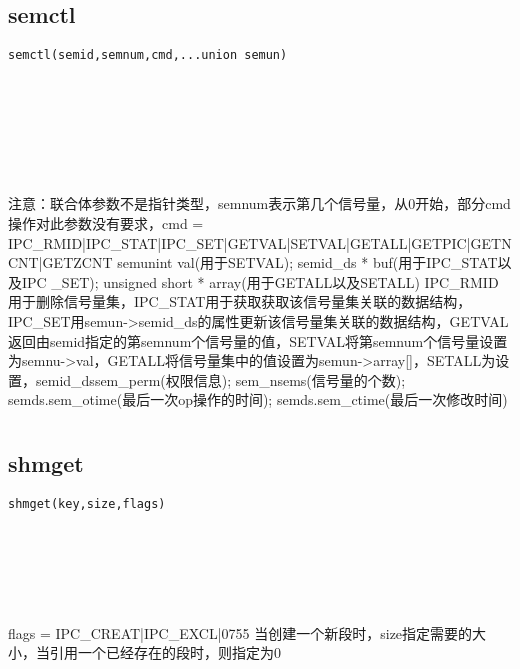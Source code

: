 \documentclass[10pt,a4paper]{article}
\begin{document}
\subsection{semctl}
\begin{spacing}{2.0}
\lstset{language=C,numbers=none}
\begin{lstlisting}
semctl(semid,semnum,cmd,...union semun)
\end{lstlisting}
{\large\color[rgb]{0.2,0.4,0.6}{semid:}} \\
{\large\color[rgb]{0.2,0.4,0.6}{semnum:}} \\
{\large\color[rgb]{0.2,0.4,0.6}{cmd:}} \\
{\large\color[rgb]{0.2,0.4,0.6}{semun:}}
\paragraph{ \ \ }注意：联合体参数不是指针类型，semnum表示第几个信号量，从0开始，部分cmd操作对此参数没有要求，cmd = IPC\_RMID|IPC\_STAT|IPC\_SET|GETVAL|SETVAL|GETALL|GETPIC|GETNCNT|GETZCNT semun{int val(用于SETVAL); semid\_ds * buf(用于IPC\_STAT以及IPC \_SET); unsigned short * array(用于GETALL以及SETALL)} IPC\_RMID用于删除信号量集，IPC\_STAT用于获取获取该信号量集关联的数据结构，IPC\_SET用semun->semid\_ds的属性更新该信号量集关联的数据结构，GETVAL返回由semid指定的第semnum个信号量的值，SETVAL将第semnum个信号量设置为semnu->val，GETALL将信号量集中的值设置为semun->array[]，SETALL为设置，semid\_ds{sem\_perm(权限信息); sem\_nsems(信号量的个数); semds.sem\_otime(最后一次op操作的时间); semds.sem\_ctime(最后一次修改时间)}
\end{spacing}

\section{\color[rgb]{0.2,0.4,0.6}{共享内存}}
\subsection{shmget}
\begin{spacing}{2.0}
\lstset{language=C,numbers=none}
\begin{lstlisting}
shmget(key,size,flags)
\end{lstlisting}
{\large\color[rgb]{0.2,0.4,0.6}{key:}} \\
{\large\color[rgb]{0.2,0.4,0.6}{size:}} \\
{\large\color[rgb]{0.2,0.4,0.6}{flags:}}
\paragraph{ \ \ }flags = IPC\_CREAT|IPC\_EXCL|0755 当创建一个新段时，size指定需要的大小，当引用一个已经存在的段时，则指定为0
\end{spacing}
\end{document}
